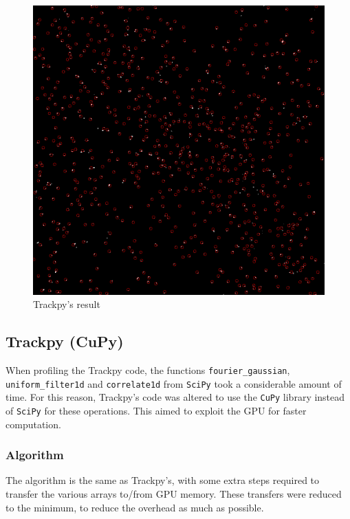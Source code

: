 \begin{figure}
	\centerline{\includegraphics[width=\locateimgsize]{images/locate/trackpy.png}}
	\caption{\centering Trackpy's result}
	\label{fig:locate:trackpy}
\end{figure}

\subsection{Trackpy (CuPy)}

When profiling the Trackpy code, the functions \texttt{fourier\_gaussian}, \texttt{uniform\_filter1d} and \texttt{correlate1d} from \texttt{SciPy} took a considerable amount of time.
For this reason, Trackpy's code was altered to use the \texttt{CuPy} library instead of \texttt{SciPy} for these operations.
This aimed to exploit the GPU for faster computation.

\subsubsection{Algorithm}

The algorithm is the same as Trackpy's, with some extra steps required to transfer the various arrays to/from GPU memory.
These transfers were reduced to the minimum, to reduce the overhead as much as possible.

